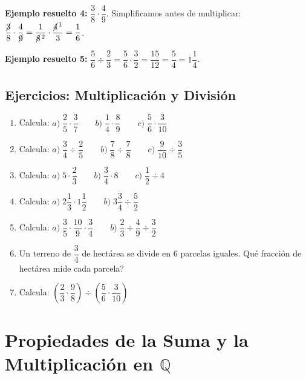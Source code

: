 \documentclass[12pt, letterpaper]{article}
\newcommand{\Q}{\mathbb{Q}}
\begin{document}
\noindent\textbf{Ejemplo resuelto 4:} $\dfrac{3}{8} \cdot \dfrac{4}{9}$. Simplificamos antes de multiplicar: $\dfrac{\cancel{3}}{8} \cdot \dfrac{4}{\cancel{9}} = \dfrac{1}{\cancel{8}^{\,2}} \cdot \dfrac{\cancel{4}^{\,1}}{3} = \dfrac{1}{6}$.

\noindent\textbf{Ejemplo resuelto 5:} $\dfrac{5}{6} \div \dfrac{2}{3} = \dfrac{5}{6} \cdot \dfrac{3}{2} = \dfrac{15}{12} = \dfrac{5}{4} = 1\dfrac{1}{4}$.

\subsection{Ejercicios: Multiplicación y División}

\begin{enumerate}[leftmargin=*]
  \item \facil{} Calcula: $a)\; \dfrac{2}{5} \cdot \dfrac{3}{7} \qquad b)\; \dfrac{1}{4} \cdot \dfrac{8}{9} \qquad c)\; \dfrac{5}{6} \cdot \dfrac{3}{10}$

  \item \facil{} Calcula: $a)\; \dfrac{3}{4} \div \dfrac{2}{5} \qquad b)\; \dfrac{7}{8} \div \dfrac{7}{8} \qquad c)\; \dfrac{9}{10} \div \dfrac{3}{5}$

  \item \facil{} Calcula: $a)\; 5 \cdot \dfrac{2}{3} \qquad b)\; \dfrac{3}{4} \cdot 8 \qquad c)\; \dfrac{1}{2} \div 4$

  \item \medio{} Calcula: $a)\; 2\dfrac{1}{3} \cdot 1\dfrac{1}{2} \qquad b)\; 3\dfrac{3}{4} \div \dfrac{5}{2}$

  \item \medio{} Calcula: $a)\; \dfrac{3}{5} \cdot \dfrac{10}{9} \cdot \dfrac{3}{4} \qquad b)\; \dfrac{2}{3} \div \dfrac{4}{9} \div \dfrac{3}{2}$

  \item \medio{} Un terreno de $\dfrac{3}{4}$ de hectárea se divide en $6$ parcelas iguales. \textquestiondown Qué fracción de hectárea mide cada parcela?

  \item \dificil{} Calcula: $\left(\dfrac{2}{3} \cdot \dfrac{9}{8}\right) \div \left(\dfrac{5}{6} \cdot \dfrac{3}{10}\right)$
\end{enumerate}

\newpage

\section{Propiedades de la Suma y la Multiplicación en $\Q$}
\end{document}
